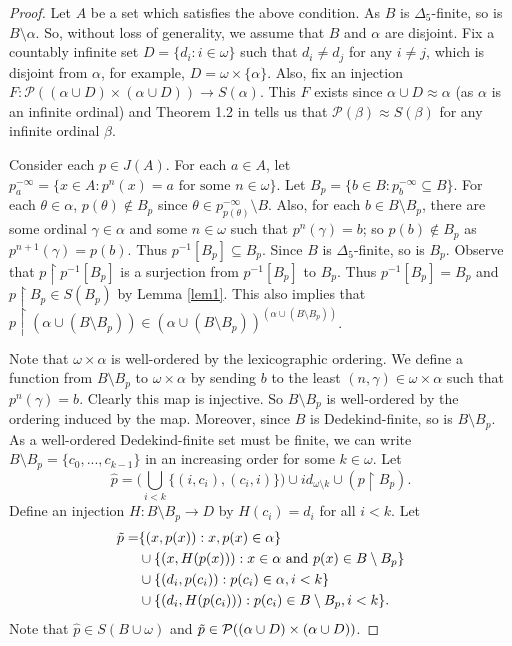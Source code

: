 \begin{proof}
    Let $A$ be a set which satisfies the above condition. As $B$ is $\Delta_5$-finite, so is $B\setminus\alpha$. So, without loss of generality, we assume that $B$ and $\alpha$ are disjoint. Fix a countably infinite set $D=\{d_{i}:i\in\omega\}$ such that $d_{i}\neq d_{j}$ for any $i\neq j$, which is disjoint from $\alpha$, for example, $D=\omega\times\{\alpha\}$. Also, fix an injection $F:\mathcal{P}((\alpha\cup D)\times(\alpha\cup D))\to S(\alpha)$. This $F$ exists since $\alpha\cup D\approx \alpha$ (as $\alpha$ is an infinite ordinal) and Theorem 1.2 in \cite{DH} tells us that $\mathcal{P}(\beta)\approx S(\beta)$ for any infinite ordinal $\beta$.
    
    Consider each $p\in J(A)$. For each $a\in A$, let $p^{-\infty}_{a}=\{x\in A:p^{n}(x)=a\text{ for some }n\in\omega\}$. Let $B_{p}=\{b\in B:p^{-\infty}_{b}\subseteq B \}$. For each $\theta\in\alpha$, $p(\theta)\not\in B_{p}$ since $\theta\in p_{p(\theta)}^{-\infty}\setminus B$. Also, for each $b\in B\setminus B_{p}$, there are some ordinal $\gamma\in\alpha$ and some $n\in\omega$ such that $p^{n}(\gamma)=b$; so $p(b)\not\in B_{p}$ as $p^{n+1}(\gamma)=p(b)$. Thus $p^{-1}[B_{p}]\subseteq B_{p}$. Since $B$ is $\Delta_5$-finite, so is $B_{p}$. Observe that $p\restriction p^{-1}[B_{p}]$ is a surjection from $p^{-1}[B_{p}]$ to $B_{p}$. Thus $p^{-1}[B_{p}]=B_{p}$ and $p\restriction B_{p}\in S(B_{p})$ by Lemma \ref{lem1}. This also implies that $p\restriction (\alpha\cup(B\setminus B_{p}))\in (\alpha\cup(B\setminus B_{p}))^{(\alpha\cup(B\setminus B_{p}))}$.
    
 
     Note that $\omega\times\alpha$ is well-ordered by the lexicographic ordering. We define a function from $B\setminus B_{p}$ to $\omega\times\alpha$ by sending $b$ to the least $(n,\gamma)\in\omega\times\alpha$ such that $p^{n}(\gamma)=b$. Clearly this map is injective. So $B\setminus B_{p}$ is well-ordered by the ordering induced by the map. Moreover, since $B$ is Dedekind-finite, so is $B\setminus B_{p}$. As a well-ordered Dedekind-finite set must be finite, we can write $B\setminus B_{p}=\{c_{0},...,c_{k-1}\}$ in an increasing order for some $k\in\omega$. Let 
     \begin{equation}\label{1}
         \hat{p}=\biggl(\bigcup_{i<k}\{(i,c_{i}),(c_{i},i)\}\biggr)\cup id_{\omega\setminus k}\cup (p\restriction B_{p}).
     \end{equation}
     Define an injection $H:B\setminus B_{p}\to D$ by $H(c_{i})=d_{i}$ for all $i<k$. Let \begin{equation}\label{2}
       \begin{aligned}
         \Tilde{p}=&\{(x,p(x)):x,p(x)\in\alpha\}\\&\cup\{(x,H(p(x))):x\in\alpha\text{ and }p(x)\in B\setminus B_{p}\}\\ 
        &\cup\{(d_{i},p(c_{i})):p(c_{i})\in\alpha,i<k\}\\&\cup\{(d_{i},H(p(c_{i}))):p(c_{i})\in B\setminus B_{p},i<k\}.
    \end{aligned}
     \end{equation} Note that $\hat{p}\in S(B\cup\omega)$ and $\Tilde{p}\in \mathcal{P}((\alpha\cup D)\times(\alpha\cup D))$.


\end{proof}
